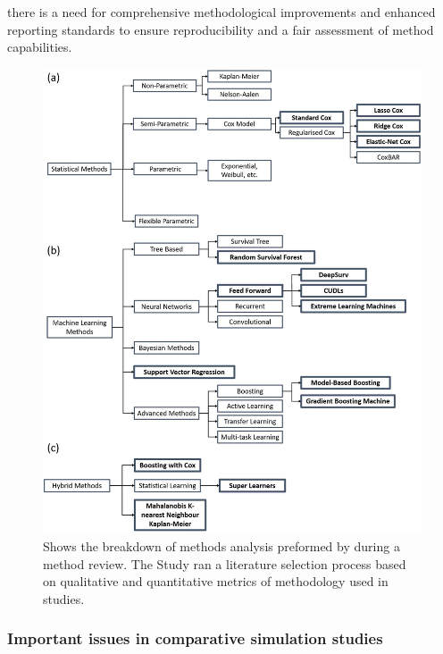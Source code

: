 there is a need for comprehensive methodological improvements and enhanced reporting standards to ensure reproducibility and a fair assessment of method capabilities.

\begin{figure}
	\includegraphics[scale=0.3]{Figures/ML_STATS_MODELS.jpg}
	\caption{Shows the breakdown of methods analysis preformed by \parencite{smith_scoping_2022} during a method review. The Study ran a literature selection process based on qualitative and quantitative metrics of methodology used in studies.}
\end{figure}
\subsubsection{Important issues in comparative simulation studies}

